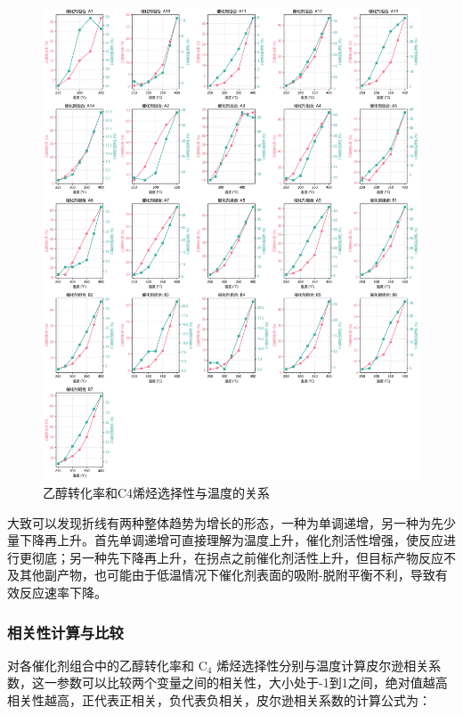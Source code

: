 \begin{figure}[h]%
	\centering%
	\includegraphics [scale=0.4]{图/1-1-1.png}
	\caption{乙醇转化率和C4烯烃选择性与温度的关系} 
	\label{fig:1}
\end{figure}

\newpage

大致可以发现折线有两种整体趋势为增长的形态，一种为单调递增，另一种为先少量下降再上升。首先单调递增可直接理解为温度上升，催化剂活性增强，使反应进行更彻底；另一种先下降再上升，在拐点之前催化剂活性上升，但目标产物反应不及其他副产物，也可能由于低温情况下催化剂表面的吸附-脱附平衡不利，导致有效反应速率下降。

\subsubsection{相关性计算与比较}
对各催化剂组合中的乙醇转化率和 \( \text{C}_4 \) 烯烃选择性分别与温度计算皮尔逊相关系数，这一参数可以比较两个变量之间的相关性，大小处于-1到1之间，绝对值越高相关性越高，正代表正相关，负代表负相关，皮尔逊相关系数的计算公式为：

